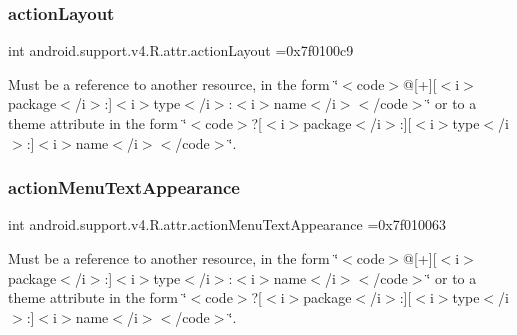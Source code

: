 \subsubsection{\texorpdfstring{action\+Layout}{actionLayout}}
{\footnotesize\ttfamily int android.\+support.\+v4.\+R.\+attr.\+action\+Layout =0x7f0100c9\hspace{0.3cm}{\ttfamily [static]}}

Must be a reference to another resource, in the form \char`\"{}$<$code$>$@\mbox{[}+\mbox{]}\mbox{[}$<$i$>$package$<$/i$>$\+:\mbox{]}$<$i$>$type$<$/i$>$\+:$<$i$>$name$<$/i$>$$<$/code$>$\char`\"{} or to a theme attribute in the form \char`\"{}$<$code$>$?\mbox{[}$<$i$>$package$<$/i$>$\+:\mbox{]}\mbox{[}$<$i$>$type$<$/i$>$\+:\mbox{]}$<$i$>$name$<$/i$>$$<$/code$>$\char`\"{}. \mbox{\label{classandroid_1_1support_1_1v4_1_1R_1_1attr_a12413683f25fb0956f8a2693d7105b3b}} 
\subsubsection{\texorpdfstring{action\+Menu\+Text\+Appearance}{actionMenuTextAppearance}}
{\footnotesize\ttfamily int android.\+support.\+v4.\+R.\+attr.\+action\+Menu\+Text\+Appearance =0x7f010063\hspace{0.3cm}{\ttfamily [static]}}

Must be a reference to another resource, in the form \char`\"{}$<$code$>$@\mbox{[}+\mbox{]}\mbox{[}$<$i$>$package$<$/i$>$\+:\mbox{]}$<$i$>$type$<$/i$>$\+:$<$i$>$name$<$/i$>$$<$/code$>$\char`\"{} or to a theme attribute in the form \char`\"{}$<$code$>$?\mbox{[}$<$i$>$package$<$/i$>$\+:\mbox{]}\mbox{[}$<$i$>$type$<$/i$>$\+:\mbox{]}$<$i$>$name$<$/i$>$$<$/code$>$\char`\"{}. \mbox{\label{classandroid_1_1support_1_1v4_1_1R_1_1attr_adaa3e9913be4b47636888a613fcaf800}} 
